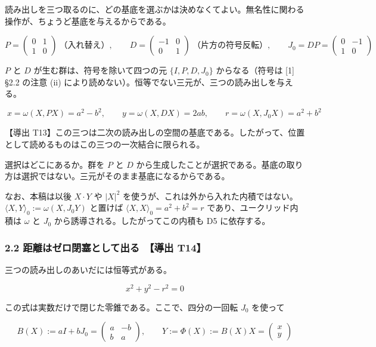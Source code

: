 \documentclass[
  a4paper,
]{ltjsarticle}
\begin{document}
読み出しを三つ取るのに、どの基底を選ぶかは決めなくてよい。無名性に関わる操作が、ちょうど基底を与えるからである。

\[
P=\begin{pmatrix}0&1\\1&0\end{pmatrix}\ \text{（入れ替え）},\qquad
D=\begin{pmatrix}-1&0\\0&1\end{pmatrix}\ \text{（片方の符号反転）},\qquad
J_0=DP=\begin{pmatrix}0&-1\\1&0\end{pmatrix}
\]

\(P\) と \(D\) が生む群は、符号を除いて四つの元 \(\{I,P,D,J_0\}\)
からなる（符号は {[}1{]} §2.2 の注意 (ii)
により読めない）。恒等でない三元が、三つの読み出しを与える。

\[
\boxed{\;x=\omega(X,PX)=a^2-b^2,\qquad y=\omega(X,DX)=2ab,\qquad r=\omega(X,J_0X)=a^2+b^2\;}
\]

【導出
T13】この三つは二次の読み出しの空間の基底である。したがって、位置として読めるものはこの三つの一次結合に限られる。

選択はどこにあるか。群を \(P\) と \(D\)
から生成したことが選択である。基底の取り方は選択ではない。三元がそのまま基底になるからである。

なお、本稿は以後 \(X\cdot Y\) や \(\lvert X\rvert^2\)
を使うが、これは外から入れた内積ではない。\(\langle X,Y\rangle_0:=\omega(X,J_0Y)\)
と置けば \(\langle X,X\rangle_0=a^2+b^2=r\) であり、ユークリッド内積は
\(\omega\) と \(J_0\) から誘導される。したがってこの内積も D5
に依存する。

\subsubsection{2.2 距離はゼロ閉塞として出る　【導出
T14】}\label{ux8dddux96e2ux306fux30bcux30edux9589ux585eux3068ux3057ux3066ux51faux308b-ux5c0eux51fa-t14}

三つの読み出しのあいだには恒等式がある。

\[
\boxed{\;x^2+y^2-r^2=0\;}
\]

この式は実数だけで閉じた零錐である。ここで、四分の一回転 \(J_0\)
を使って

\[
B(X):=aI+bJ_0=
\begin{pmatrix}a&-b\\b&a\end{pmatrix},
\qquad
Y:=\Phi(X):=B(X)X=
\begin{pmatrix}x\\y\end{pmatrix}
\]
\end{document}
